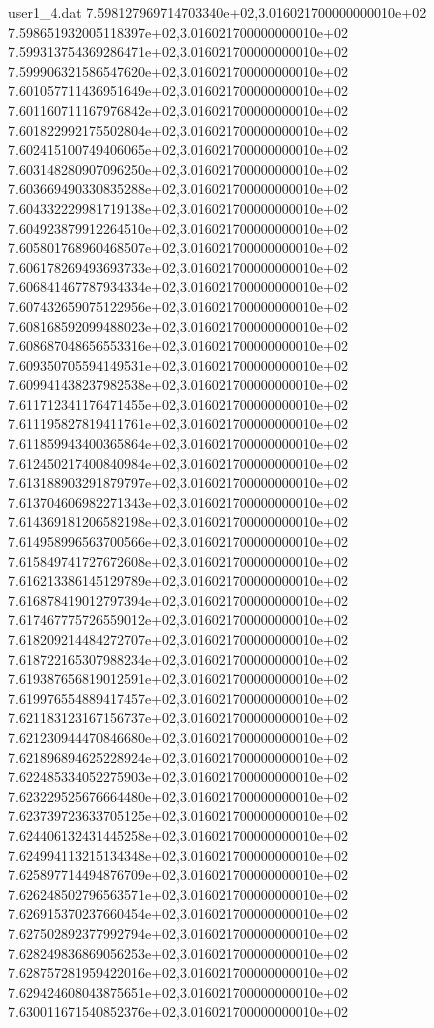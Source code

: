 \begin{filecontents}{user1_4.dat}
7.598127969714703340e+02,3.016021700000000010e+02
7.598651932005118397e+02,3.016021700000000010e+02
7.599313754369286471e+02,3.016021700000000010e+02
7.599906321586547620e+02,3.016021700000000010e+02
7.601057711436951649e+02,3.016021700000000010e+02
7.601160711167976842e+02,3.016021700000000010e+02
7.601822992175502804e+02,3.016021700000000010e+02
7.602415100749406065e+02,3.016021700000000010e+02
7.603148280907096250e+02,3.016021700000000010e+02
7.603669490330835288e+02,3.016021700000000010e+02
7.604332229981719138e+02,3.016021700000000010e+02
7.604923879912264510e+02,3.016021700000000010e+02
7.605801768960468507e+02,3.016021700000000010e+02
7.606178269493693733e+02,3.016021700000000010e+02
7.606841467787934334e+02,3.016021700000000010e+02
7.607432659075122956e+02,3.016021700000000010e+02
7.608168592099488023e+02,3.016021700000000010e+02
7.608687048656553316e+02,3.016021700000000010e+02
7.609350705594149531e+02,3.016021700000000010e+02
7.609941438237982538e+02,3.016021700000000010e+02
7.611712341176471455e+02,3.016021700000000010e+02
7.611195827819411761e+02,3.016021700000000010e+02
7.611859943400365864e+02,3.016021700000000010e+02
7.612450217400840984e+02,3.016021700000000010e+02
7.613188903291879797e+02,3.016021700000000010e+02
7.613704606982271343e+02,3.016021700000000010e+02
7.614369181206582198e+02,3.016021700000000010e+02
7.614958996563700566e+02,3.016021700000000010e+02
7.615849741727672608e+02,3.016021700000000010e+02
7.616213386145129789e+02,3.016021700000000010e+02
7.616878419012797394e+02,3.016021700000000010e+02
7.617467775726559012e+02,3.016021700000000010e+02
7.618209214484272707e+02,3.016021700000000010e+02
7.618722165307988234e+02,3.016021700000000010e+02
7.619387656819012591e+02,3.016021700000000010e+02
7.619976554889417457e+02,3.016021700000000010e+02
7.621183123167156737e+02,3.016021700000000010e+02
7.621230944470846680e+02,3.016021700000000010e+02
7.621896894625228924e+02,3.016021700000000010e+02
7.622485334052275903e+02,3.016021700000000010e+02
7.623229525676664480e+02,3.016021700000000010e+02
7.623739723633705125e+02,3.016021700000000010e+02
7.624406132431445258e+02,3.016021700000000010e+02
7.624994113215134348e+02,3.016021700000000010e+02
7.625897714494876709e+02,3.016021700000000010e+02
7.626248502796563571e+02,3.016021700000000010e+02
7.626915370237660454e+02,3.016021700000000010e+02
7.627502892377992794e+02,3.016021700000000010e+02
7.628249836869056253e+02,3.016021700000000010e+02
7.628757281959422016e+02,3.016021700000000010e+02
7.629424608043875651e+02,3.016021700000000010e+02
7.630011671540852376e+02,3.016021700000000010e+02

\end{filecontents}
